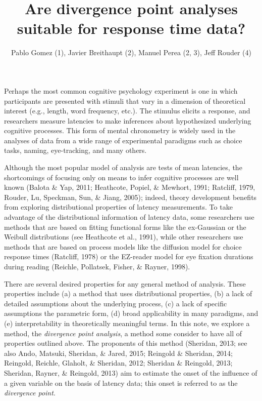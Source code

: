 \documentclass[man]{apa}%
\title{Are divergence point analyses suitable for response time data?}
\author{Pablo Gomez (1), Javier Breithaupt (2), Manuel Perea (2, 3), Jeff Rouder (4)}
\affiliation{(1) DePaul University, Chicago IL, USA \\ 
                 (2) Universitat de Val\`encia, Valencia, Spain \\ 
                 (3) BCBL, Basque Center on Cognition, Brain, and Language, San Sebasti\'an, Spain \\
                 (4) University of Missouri, Columbia MO, USA}
\begin{document}

\maketitle   



Perhaps the most common cognitive psychology experiment is one in which participants are presented with stimuli that vary in a dimension of theoretical interest (e.g., length, word frequency, etc.). The stimulus elicits a response, and researchers  measure latencies to make inferences about hypothesized underlying cognitive processes.  This form of mental chronometry is widely used in the analyses of data from a wide range of experimental paradigms such as choice tasks, naming, eye-tracking, and many others.

   Although the most popular model of analysis are tests of mean latencies, the shortcomings of focusing only on  means to infer cognitive processes are well known (Balota \& Yap, 2011; Heathcote, Popiel, \& Mewhort, 1991; Ratcliff, 1979, Rouder, Lu, Speckman, Sun,  \& Jiang, 2005); indeed, theory development benefits from exploring distributional properties of latency measurements.  To take advantage of the distributional information of latency data, some researchers use methods that are based on fitting functional forms like the ex-Gaussian or the Weibull distributions (see Heathcote et al., 1991), while other researchers use methods that are based on process models like the diffusion model for choice response times (Ratcliff, 1978) or the EZ-reader model for eye fixation durations during reading (Reichle, Pollatsek, Fisher, \& Rayner, 1998). 
           
       There are several desired properties for any general method of analysis. These properties include (a) a method that uses distributional properties, (b) a lack of detailed assumptions about the underlying process, (c) a lack of specific assumptions the parametric form, (d) broad applicability in many paradigms, and (e) interpretability in theoretically meaningful terms. In this note, we explore a method, the \emph{divergence point analysis},  a method some consider to have all of  properties outlined above. The proponents of this method (Sheridan, 2013; see also Ando, Matsuki, Sheridan, \& Jared, 2015; Reingold \& Sheridan, 2014; Reingold, Reichle, Glaholt, \& Sheridan, 2012; Sheridan \& Reingold, 2013; Sheridan, Rayner, \& Reingold, 2013) aim to estimate the onset of the influence of a given variable on the basis of latency data; this onset is referred to as the \emph{divergence point}.
               
\end{document}
